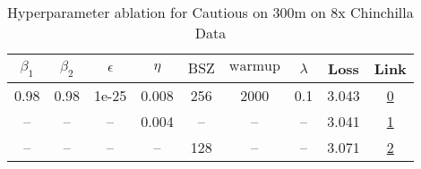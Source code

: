 \begin{table}[H]
\centering
\caption{Hyperparameter ablation for Cautious on 300m on 8x Chinchilla Data}
\label{tab:ablation_cautious_300m_8}
\begin{tabular}{ccccccccc}
\toprule
$\beta_1$ & $\beta_2$ & $\epsilon$ & $\eta$ & $\mathrm{BSZ}$ & $\mathrm{warmup}$ & $\lambda$ & Loss & Link \\
\midrule
0.98 & 0.98 & 1e-25 & 0.008 & 256 & 2000 & 0.1 & 3.043 & \href{https://wandb.ai/stanford-mercury/optimizer-scaling/runs/sweep-300m-48B-cautious1c558clr0.008-wd0.1-minlr0-warmup2000-b10-cae294}{0} \\
\midrule
-- & -- & -- & 0.004 & -- & -- & -- & 3.041 & \href{https://wandb.ai/stanford-mercury/optimizer-scaling/runs/sweep-300m-48B-cautious3f9d23lr0.004-wd0.1-minlr0-warmup2000-b10-a68907}{1} \\
-- & -- & -- & -- & 128 & -- & -- & 3.071 & \href{https://wandb.ai/stanford-mercury/optimizer-scaling/runs/sweep-300m-48B-cautious41cea2lr0.008-wd0.1-minlr0-warmup2000-b10-d0662d}{2} \\
\bottomrule
\end{tabular}
\end{table}

